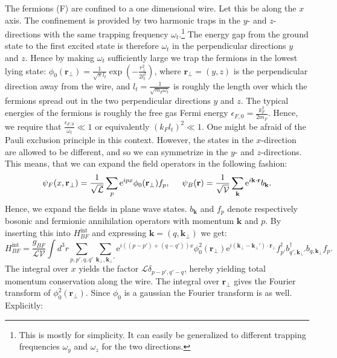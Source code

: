 The fermions (F) are confined to a one dimensional wire. Let this be along the $x$ axis. The confinement is provided by two harmonic traps in the $y$- and $z$-directions with the same trapping frequency $\omega_t$.\footnote{This is mostly for simplicity. It can easily be generalized to different trapping frequencies $\omega_y$ and $\omega_z$ for the two directions.} The energy gap from the ground state to the first excited state is therefore $\omega_t$ in the perpendicular directions $y$ and $z$. Hence by making $\omega_t$ sufficiently large we trap the fermions in the lowest lying state: $\phi_0(\mathbf{r}_\perp) = \frac{1}{\sqrt{\pi}l_t}\exp\left(-\frac{r_\perp^2}{2l_t^2}\right)$, where $\mathbf{r}_\perp = (y,z)$ is the perpendicular direction away from the wire, and $l_t = \frac{1}{\sqrt{m_F \omega_t}}$ is roughly the length over which the fermions spread out in the two perpendicular directions $y$ and $z$. The typical energies of the fermions is roughly the free gas Fermi energy $\epsilon_{F,0} = \frac{k_F^2}{2m_F}$. Hence, we require that $\frac{\epsilon_{F,0}}{\omega_t} \ll 1$ or equivalently $(k_Fl_t)^2\ll 1$. One might be afraid of the Pauli exclusion principle in this context. However, the states in the $x$-direction are allowed to be different, and so we can symmetrize in the $y$- and $z$-directions. This means, that we can expand the field operators in the following fashion:
\begin{equation}
\psi_F(x,\mathbf{r}_\perp) = \frac{1}{\sqrt{\mathcal{L}}}\sum_p \text{e}^{ipx} \phi_0(\mathbf{r}_\perp) f_p, \hspace{0.5cm} \psi_B(\mathbf{r}) = \frac{1}{\sqrt{\mathcal{V}}}\sum_{\mathbf{k}} \text{e}^{i\mathbf{k}\cdot \mathbf{r}} b_\mathbf{k}. 
\end{equation}   
Hence, we expand the fields in plane wave states. $b_\mathbf{k}$ and $f_p$ denote respectively bosonic and fermionic annihilation operators with momentum $\mathbf{k}$ and $p$. By inserting this into $H_{BF}^\text{int}$ and expressing $\mathbf{k} = (q,\mathbf{k}_\perp)$ we get:
\begin{equation}
H_{BF}^\text{int} = \frac{g_{BF}}{\mathcal{LV}}\int d^3 r \sum_{p,p',q,q'}\sum_{\mathbf{k}_{\perp},\mathbf{k}_{\perp}'}\text{e}^{i((p-p')+(q-q'))x} \phi^2_0(\mathbf{r}_{\perp})\text{e}^{i(\mathbf{k}_{\perp}-\mathbf{k}_{\perp}')\cdot \mathbf{r}_\perp} f^\dagger_{p'} b^\dagger_{q',\mathbf{k}_\perp'}b_{q,\mathbf{k}_\perp}f_p. \nonumber
\end{equation}
The integral over $x$ yields the factor $\mathcal{L}\delta_{p-p',q'-q}$, hereby yielding total momentum conservation along the wire. The integral over $\mathbf{r}_\perp$ gives the Fourier transform of $\phi_0^2(\mathbf{r}_\perp)$. Since $\phi_0$ is a gaussian the Fourier transform is as well. Explicitly:
